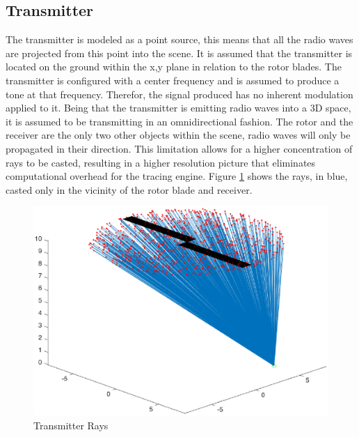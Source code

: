 \subsection{Transmitter}
The transmitter is modeled as a point source, this means that all the radio waves are projected from this point into the scene. It is assumed that the transmitter is located on the ground within the x,y plane in relation to the rotor blades. The transmitter is configured with a center frequency and is assumed to produce a tone at that frequency. Therefor, the signal produced has no inherent modulation applied to it.
Being that the transmitter is emitting radio waves into a 3D space, it is assumed to be transmitting in an omnidirectional fashion. The rotor and the receiver are the only two other objects within the scene, radio waves will only be propagated in their direction. This limitation allows for a higher concentration of rays to be casted, resulting in a higher resolution picture that eliminates computational overhead for the tracing engine. Figure \ref{fig:transmitter_direction} shows the rays, in blue, casted only in the vicinity of the rotor blade and receiver.

\begin{figure}
	\begin{center}
		\includegraphics[width=15cm]{images/radio_propagation/transmitted.eps}
		\caption{Transmitter Rays}
		\label{fig:transmitter_direction}
	\end{center}
\end{figure}

